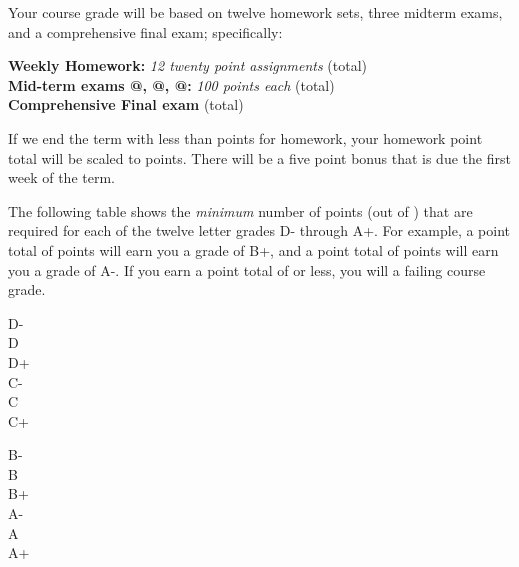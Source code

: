 \documentclass[12pt]{article}
\makeatletter
\newcounter{hw}\setcounter{hw}{0}
\newcommand*{\rom}[1]{\expandafter\@slowromancap\romannumeral #1@}
\newcounter{ex}\setcounter{ex}{0}
\newenvironment{mypar}[2]
  {\begin{list}{}%
    {\setlength\leftmargin{#1}
    \setlength\rightmargin{#2}}
    \item[]}
  {\end{list}}
\makeatother
\begin{document}
Your course grade will be based on twelve homework sets, three midterm exams, and a comprehensive 
final exam; specifically:
\begin{mypar}{0.25in}{0.25in}
    \textbf{Weekly Homework:}  \emph{12 twenty point assignments}  \dotfill \hwpts\/ (total) \\
    \textbf{Mid-term exams \rom{1}, \rom{2}, \rom{3}:} \emph{100 points each}  (total)\\
    \textbf{Comprehensive Final exam}  (total)
\end{mypar}
If we end the term with less than \hwpts\/ points for homework,  
your homework point total will be scaled to \hwpts\/ points. 
There will be a five point bonus that is due the first week of the 
term.






The following table shows the \emph{minimum} number of points (out of \points) that
are required for each of the twelve letter grades D- through A+. For
example, a point total of \Bp\/  points will earn you a grade of B+,  and 
a point total of \Am\/ points will earn you a grade of A-. If you earn a point
total of \F\/  or less, you will a failing course grade.
 
 \vspace{0.1in}
     \begin{minipage}{5.5in}
  \centering 
\begin{mypar}{0.25in}{0.25in}
    \begin{minipage}{2.5in}
        D-  \dotfill \Dm \\
        D \dotfill \D \\
        D+ \dotfill \Dp \\
        C- \dotfill \Cm  \\
        C \dotfill \C \\
        C+ \dotfill \Cp 
        \end{minipage}
    \phantom{xxxxx}
    \begin{minipage}{2.5in}
        B- \dotfill \Bm \\
        B \dotfill  \B \\
        B+ \dotfill  \Bp\\
        A- \dotfill  \Am \\
        A \dotfill  \A \\
        A+ \dotfill  \Ap
    \end{minipage}
\end{mypar} 
\end{minipage}
\end{document}
